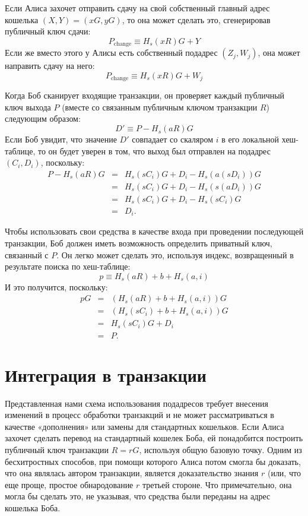 \documentclass{mrl}
\begin{document}
Если Алиса захочет отправить сдачу на свой собственный главный адрес кошелька $(X,Y) = (xG,yG)$, то она может сделать это, сгенерировав публичный ключ сдачи:
$$P_{\operatorname{change}} \equiv H_s(xR)G + Y$$
Если же вместо этого у Алисы есть собственный подадрес $(Z_j,W_j)$, она может направить сдачу на него:
$$P_{\operatorname{change}} \equiv H_s(xR)G + W_j$$

Когда Боб сканирует входящие транзакции, он проверяет каждый публичный ключ выхода $P$ (вместе со связанным публичным ключом транзакции $R$) следующим образом:
$$D' \equiv P - H_s(aR)G$$
Если Боб увидит, что значение $D'$ совпадает со скаляром $i$ в его локальной хеш-таблице, то он будет уверен в том, что выход был отправлен на подадрес $(C_i,D_i)$, поскольку:
\begin{eqnarray*}
P - H_s(aR)G &=& H_s(sC_i)G + D_i - H_s(a(sD_i))G \\
&=& H_s(sC_i)G + D_i - H_s(s(aD_i))G \\
&=& H_s(sC_i)G + D_i - H_s(sC_i)G \\
&=& D_i.
\end{eqnarray*}

Чтобы использовать свои средства в качестве входа при проведении последующей транзакции, Боб должен иметь возможность определить приватный ключ, связанный с $P$. Он легко может сделать это, используя индекс, возвращенный в результате поиска по хеш-таблице:
$$p \equiv H_s(aR) + b + H_s(a,i)$$
И это получится, поскольку:
\begin{eqnarray*}
pG &=& (H_s(aR) + b + H_s(a,i))G \\
&=& (H_s(sC_i) + b + H_s(a,i))G \\
&=& H_s(sC_i)G + D_i \\
&=& P.
\end{eqnarray*}


\section{Интеграция в транзакции}
Представленная нами схема использования подадресов требует внесения изменений в процесс обработки транзакций и не может рассматриваться в качестве «дополнения» или замены для стандартных кошельков. Если Алиса захочет сделать перевод на стандартный кошелек Боба, ей понадобится построить публичный ключ транзакции $R = rG$, используя общую базовую точку. Одним из бесхитростных способов, при помощи которого Алиса потом смогла бы доказать, что она являлась автором транзакции, является доказательство знания $r$ (или, что еще проще, простое обнародование $r$ третьей стороне. Что примечательно, она могла бы сделать это, не указывая, что средства были переданы на адрес кошелька Боба.
\end{document}
